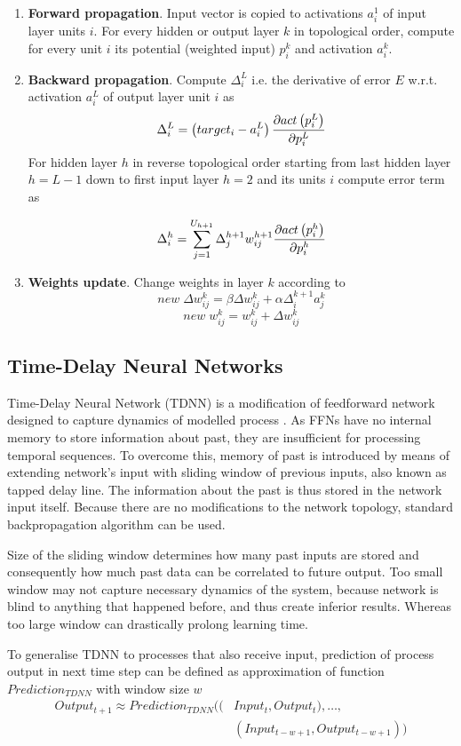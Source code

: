 \documentclass[12pt,oneside]{fithesis2}
\begin{document}
\begin{enumerate}
  \item \textbf{Forward propagation}. Input vector is copied to activations $a_i^1$ of input layer units $i$. For every hidden or output layer $k$ in topological order, compute for every unit $i$ its potential (weighted input) $p_i^k$ and activation $a_i^k$.
  
  \item \textbf{Backward propagation}. Compute $\Delta^L_i$ i.e. the derivative of error $E$  w.r.t. activation $a_i^L$ of output layer unit $i$ as
  $$\Delta^L_i = \left(target_i - a^L_i\right){{\partial{act\left(p^L_i\right)}} \over {\partial p^L_i}}$$
 For hidden layer $h$ in reverse topological order starting from last hidden layer $h = L-1$ down to first input layer $h=2$ and its units $i$ compute error term as
 
  $$\Delta^h_i = \sum\limits_{j=1}^{U_{h + 1}} \Delta_{j}^{h+1}w_{ij}^{h+1} {{\partial{act\left(p^h_i\right)}} \over {\partial p^h_i}}$$
  
  \item \textbf{Weights update}. Change weights in layer $k$ according to
  $$new \; \Delta w_{ij}^k = \beta \Delta w_{ij}^k + \alpha \Delta_i^{k+1} a_{j}^{k}$$
  $$new \; w_{ij}^k = w_{ij}^k +  \Delta w_{ij}^k$$

\end{enumerate}


\subsection{Time-Delay Neural Networks}
Time-Delay Neural Network (TDNN) is a modification of feedforward network designed to capture dynamics of modelled process \cite{phoneme-recognition-tdnn}. As FFNs have no internal memory to store information about past, they are insufficient for processing temporal sequences. To overcome this, memory of past is introduced by means of extending network's input with sliding window of previous inputs, also known as tapped delay line. The information about the past is thus stored in the network input itself. Because there are no modifications to the network topology, standard backpropagation algorithm can be used.\par
Size of the sliding window determines how many past inputs are stored and consequently how much past data can be correlated to future output. Too small window may not capture necessary dynamics of the system, because network is blind to anything that happened before, and thus create inferior results. Whereas too large window can drastically prolong learning time.\par
To generalise TDNN to processes that also receive input, prediction of process output in next time step can be defined as approximation of function $Prediction_{TDNN}$ with window size $w$
	\[
		\begin{split}
		Output_{t+1} \approx Prediction_{TDNN}((&Input_t,Output_t), \dots, \\
										&(Input_{t-w+1},Output_{t-w+1}))
		\end{split}
	\]
	
\end{document}
